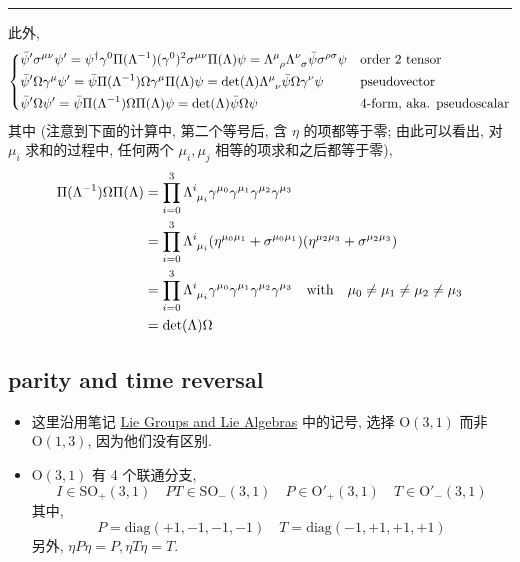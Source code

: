 \begin{itemize}
\begin{tcolorbox}[title=calculation:]
		\noindent\rule[0.5ex]{\linewidth}{0.5pt} %
		
		此外,
		\begin{equation}
			\begin{dcases}
				\bar{\psi}' \sigma^{\mu \nu} \psi' = \psi^\dag \gamma^0 \Pi(\Lambda^{- 1}) (\gamma^0)^2 \sigma^{\mu \nu} \Pi(\Lambda) \psi = \tensor{\Lambda}{^\mu_\rho} \tensor{\Lambda}{^\nu_\sigma} \bar{\psi} \sigma^{\rho \sigma} \psi & \text{order 2 tensor} \\
				\bar{\psi}' \Omega \gamma^\mu \psi' = \bar{\psi} \Pi(\Lambda^{- 1}) \Omega \gamma^\mu \Pi(\Lambda) \psi = \det(\Lambda) \tensor{\Lambda}{^\mu_\nu} \bar{\psi} \Omega \gamma^\nu \psi & \text{pseudovector} \\
				\bar{\psi}' \Omega \psi' = \bar{\psi} \Pi(\Lambda^{- 1}) \Omega \Pi(\Lambda) \psi = \det(\Lambda) \bar{\psi} \Omega \psi & \text{4-form, aka. pseudoscalar}
			\end{dcases}
		\end{equation}
		其中 (注意到下面的计算中, 第二个等号后, 含 $\eta$ 的项都等于零; 由此可以看出, 对 $\mu_i$ 求和的过程中, 任何两个 $\mu_i, \mu_j$ 相等的项求和之后都等于零),
		\begin{align}
			\Pi(\Lambda^{- 1}) \Omega \Pi(\Lambda) &= \prod_{i = 0}^3 \tensor{\Lambda}{^i_{\mu_i}} \gamma^{\mu_0} \gamma^{\mu_1} \gamma^{\mu_2} \gamma^{\mu_3} \notag \\
			&= \prod_{i = 0}^3 \tensor{\Lambda}{^i_{\mu_i}} (\eta^{\mu_0 \mu_1} + \sigma^{\mu_0 \mu_1}) (\eta^{\mu_2 \mu_3} + \sigma^{\mu_2 \mu_3}) \notag \\
			&= \prod_{i = 0}^3 \tensor{\Lambda}{^i_{\mu_i}} \gamma^{\mu_0} \gamma^{\mu_1} \gamma^{\mu_2} \gamma^{\mu_3} \quad \text{with} \quad \mu_0 \neq \mu_1 \neq \mu_2 \neq \mu_3 \notag \\
			&= \det(\Lambda) \Omega
		\end{align}
	\end{tcolorbox}
\end{itemize}

\subsection{parity and time reversal}
\begin{itemize}
	\item 这里沿用笔记 \href{https://github.com/siyang03/my-note---Lie-Groups-and-Lie-Algebras}{Lie Groups and Lie Algebras} 中的记号, 选择 $\mathrm{O}(3, 1)$ 而非 $\mathrm{O}(1, 3)$, 因为他们没有区别.
	
	\item $\mathrm{O}(3, 1)$ 有 4 个联通分支,
	\begin{equation}
		I \in \mathrm{SO}_+(3, 1) \quad P T \in \mathrm{SO}_-(3, 1) \quad P \in \mathrm{O}'_+(3, 1) \quad T \in \mathrm{O}'_-(3, 1)
	\end{equation}
	其中,
	\begin{equation}
		P = \mathrm{diag}(+ 1, - 1, - 1, - 1) \quad T = \mathrm{diag}(- 1, + 1, + 1, + 1)
	\end{equation}
	另外, $\eta P \eta = P, \eta T \eta = T$.
\end{itemize}

